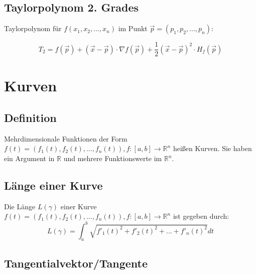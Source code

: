 \documentclass[a4paper,11pt]{article}
\begin{document}
	\subsection{Taylorpolynom 2. Grades} %
	\label{sub:taylorpolynom_2_grades}
	
	Taylorpolynom für $f(x_1,x_2,...,x_n)$ im Punkt $\overrightarrow{p} = (p_1,p_2,...,p_n)$:

	\begin{equation}
		T_2 = f(\overrightarrow{p}) + (\overrightarrow{x}-\overrightarrow{p}) \cdot \nabla f(\overrightarrow{p})+\frac{1}{2}
		(\overrightarrow{x}-\overrightarrow{p})^2 \cdot H_f(\overrightarrow{p})
	\end{equation}
	
	
	\pagebreak
	
	\section{Kurven} %
	\label{sec:kurven}
	
	\subsection{Definition} %
	\label{sub:definition}
	
	Mehrdimensionale Funktionen der Form $f(t) = (f_1(t),f_2(t),...,f_n(t)), f:[a,b] \rightarrow \mathbb{R}^n$ heißen Kurven.
	Sie haben ein Argument in $\mathbb{R}$ und mehrere Funktionswerte im $\mathbb{R}^n$.
	
	\subsection{Länge einer Kurve} %
	\label{sub:länge_einer_kurve}
	
	Die Länge $L(\gamma)$ einer Kurve $f(t) = (f_1(t),f_2(t),...,f_n(t)), f:[a,b] \rightarrow \mathbb{R}^n$ ist gegeben durch:
	\begin{equation}
		L(\gamma) = \int_a^b \sqrt{f'_1(t)^2 + f'_2(t)^2 + ... + f'_n(t)^2}dt
	\end{equation}
	
	\subsection{Tangentialvektor/Tangente} %
	\label{sub:tangentialvektor_tangente}
	
\end{document}

